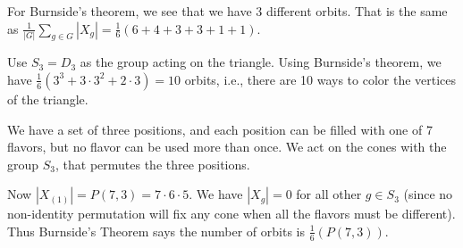 \protect \documentclass [11pt]{exam}
\renewenvironment{Ans}[1]{\setcounter{question}{#1}\addtocounter{question}{-1}\question }{}
\begin{document}
\begin{questions}
\begin{Ans}{9}
  For Burnside's theorem, we see that we have $3$ different orbits.  That is the same as $\frac{1}{|G|}\sum_{g \in G}|X_g| = \frac{1}{6}(6 + 4 + 3+3+1+1)$.
\end{Ans}
\begin{Ans}{10}
  Use $S_3 = D_3$ as the group acting on the triangle.  Using Burnside's theorem, we have $\frac{1}{6}(3^3 + 3 \cdot 3^2 + 2 \cdot 3) = 10$ orbits, i.e., there are 10 ways to color the vertices of the triangle.
\end{Ans}
\begin{Ans}{11}
  We have a set of three positions, and each position can be filled with one of 7 flavors, but no flavor can be used more than once.  We act on the cones with the group $S_3$, that permutes the three positions.

  Now $|X_{(1)}| = P(7,3) = 7\cdot 6 \cdot 5$.  We have $|X_g| = 0$ for all other $g \in S_3$ (since no non-identity permutation will fix any cone when all the flavors must be different).  Thus Burnside's Theorem says the number of orbits is $\frac{1}{6}(P(7,3))$.
\end{Ans}
 \protect \end {questions} \par \protect 
\end{document}
